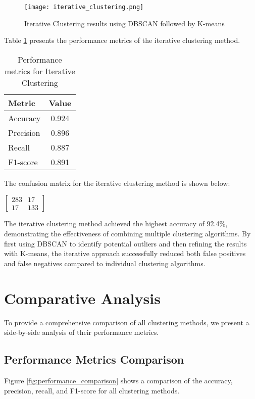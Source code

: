 \begin{figure}[h]
    \centering
    \texttt{[image: iterative\_clustering.png]}
    \caption{Iterative Clustering results using DBSCAN followed by K-means}
    \label{fig:iterative_clustering}
\end{figure}

Table \ref{tab:iterative_performance} presents the performance metrics of the iterative clustering method.

\begin{table}[h]
    \centering
    \caption{Performance metrics for Iterative Clustering}
    \label{tab:iterative_performance}
    \begin{tabular}{lc}
        \toprule
        Metric & Value \\
        \midrule
        Accuracy & 0.924 \\
        Precision & 0.896 \\
        Recall & 0.887 \\
        F1-score & 0.891 \\
        \bottomrule
    \end{tabular}
\end{table}

The confusion matrix for the iterative clustering method is shown below:
\begin{center}
$\begin{bmatrix}
283 & 17 \\
17 & 133
\end{bmatrix}$
\end{center}

The iterative clustering method achieved the highest accuracy of 92.4\%, demonstrating the effectiveness of combining multiple clustering algorithms. By first using DBSCAN to identify potential outliers and then refining the results with K-means, the iterative approach successfully reduced both false positives and false negatives compared to individual clustering algorithms.

\section{Comparative Analysis}
To provide a comprehensive comparison of all clustering methods, we present a side-by-side analysis of their performance metrics.

\subsection{Performance Metrics Comparison}
Figure \ref{fig:performance_comparison} shows a comparison of the accuracy, precision, recall, and F1-score for all clustering methods.

